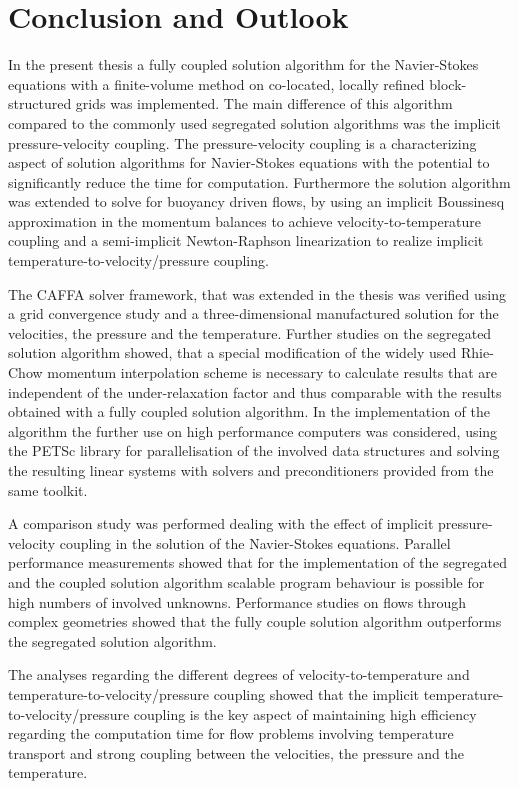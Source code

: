 \section{Conclusion and Outlook}

In the present thesis a fully coupled solution algorithm for the Navier-Stokes equations with a finite-volume method on co-located, locally refined block-structured grids was implemented. The main difference of this algorithm compared to the commonly used segregated solution algorithms was the implicit pressure-velocity coupling. The pressure-velocity coupling is a characterizing aspect of solution algorithms for Navier-Stokes equations with the potential to significantly reduce the time for computation. Furthermore the solution algorithm was extended to solve for buoyancy driven flows, by using an implicit Boussinesq approximation in the momentum balances to achieve velocity-to-temperature coupling and a semi-implicit Newton-Raphson linearization to realize implicit temperature-to-velocity/pressure coupling.

The CAFFA solver framework, that was extended in the thesis was verified using a grid convergence study and a three-dimensional manufactured solution for the velocities, the pressure and the temperature. Further studies on the segregated solution algorithm showed, that a special modification of the widely used Rhie-Chow momentum interpolation scheme is necessary to calculate results that are independent of the under-relaxation factor and thus comparable with the results obtained with a fully coupled solution algorithm. In the implementation of the algorithm the further use on high performance computers was considered, using the PETSc library for parallelisation of the involved data structures and solving the resulting linear systems with solvers and preconditioners provided from the same toolkit.

A comparison study was performed dealing with the effect of implicit pressure-velocity coupling in the solution of the Navier-Stokes equations. Parallel performance measurements showed that for the implementation of the segregated and the coupled solution algorithm scalable program behaviour is possible for high numbers of involved unknowns. Performance studies on flows through complex geometries showed that the fully couple solution algorithm outperforms the segregated solution algorithm. 

The analyses regarding the different degrees of velocity-to-temperature and temperature-to-velocity/pressure coupling showed that the implicit temperature-to-velocity/pressure coupling is the key aspect of maintaining high efficiency regarding the computation time for flow problems involving temperature transport and strong coupling between the velocities, the pressure and the temperature.

